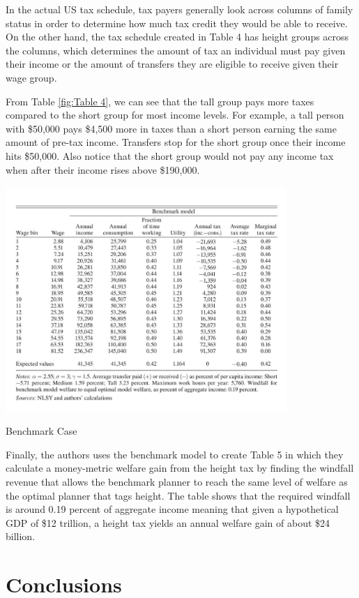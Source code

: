 \documentclass[titlepage]{\econtex}
\begin{document}
  In the actual US tax schedule, tax payers generally look across columns of family status in order to determine how much tax credit they would be able to receive. On the other hand, the tax schedule created in Table 4 has height groups across the columns, which determines the amount of tax an individual must pay given their income or the amount of transfers they are eligible to receive given their wage group.

 From Table \ref{fig:Table 4}, we can see that the tall group pays more taxes compared to the short group for most income levels. For example, a tall person with \$50,000 pays \$4,500 more in taxes than a short person earning the same amount of pre-tax income. Transfers stop for the short group once their income hits \$50,000. Also notice that the short group would not pay any income tax when after their income rises above \$190,000.

\begin{table}[H]
  \centering
  \label{fig:Table 5}
  \includegraphics[width=0.8\textwidth]{BenchmarkCase.JPG}
  \caption{Benchmark Case}
  \end{table}
  
  Finally, the authors uses the benchmark model to create Table 5 in which they calculate a money-metric welfare gain from the height tax by finding the windfall revenue that allows the benchmark planner to reach the same level of welfare as the optimal planner that tags height. The table shows that the required windfall is around 0.19 percent of aggregate income meaning that given a hypothetical GDP of \$12 trillion, a height tax yields an annual welfare gain of about \$24 billion.

\hypertarget{Conclusions}{}
\section{Conclusions}
\end{document}

